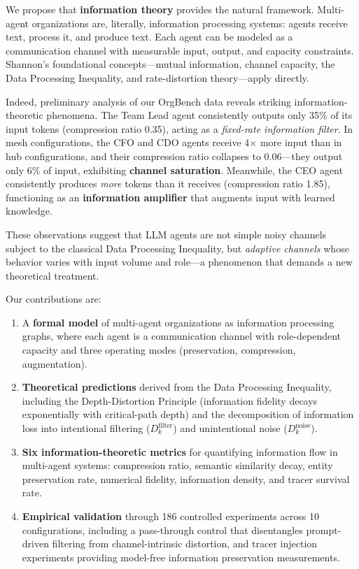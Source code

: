\documentclass[conference]{IEEEtran}
\begin{document}
We propose that \textbf{information theory} provides the natural framework.
Multi-agent organizations are, literally, information processing systems: agents receive text, process it, and produce text.
Each agent can be modeled as a communication channel with measurable input, output, and capacity constraints.
Shannon's foundational concepts---mutual information, channel capacity, the Data Processing Inequality, and rate-distortion theory---apply directly.

Indeed, preliminary analysis of our OrgBench data reveals striking information-theoretic phenomena.
The Team Lead agent consistently outputs only 35\% of its input tokens (compression ratio 0.35), acting as a \emph{fixed-rate information filter}.
In mesh configurations, the CFO and CDO agents receive 4$\times$ more input than in hub configurations, and their compression ratio collapses to 0.06---they output only 6\% of input, exhibiting \textbf{channel saturation}.
Meanwhile, the CEO agent consistently produces \emph{more} tokens than it receives (compression ratio 1.85), functioning as an \textbf{information amplifier} that augments input with learned knowledge.

These observations suggest that LLM agents are not simple noisy channels subject to the classical Data Processing Inequality, but \emph{adaptive channels} whose behavior varies with input volume and role---a phenomenon that demands a new theoretical treatment.


Our contributions are:
\begin{enumerate}
    \item A \textbf{formal model} of multi-agent organizations as information processing graphs, where each agent is a communication channel with role-dependent capacity and three operating modes (preservation, compression, augmentation).
    \item \textbf{Theoretical predictions} derived from the Data Processing Inequality, including the Depth-Distortion Principle (information fidelity decays exponentially with critical-path depth) and the decomposition of information loss into intentional filtering ($D_k^{\text{filter}}$) and unintentional noise ($D_k^{\text{noise}}$).
    \item \textbf{Six information-theoretic metrics} for quantifying information flow in multi-agent systems: compression ratio, semantic similarity decay, entity preservation rate, numerical fidelity, information density, and tracer survival rate.
    \item \textbf{Empirical validation} through 186 controlled experiments across 10 configurations, including a pass-through control that disentangles prompt-driven filtering from channel-intrinsic distortion, and tracer injection experiments providing model-free information preservation measurements.
\end{enumerate}
\end{document}

